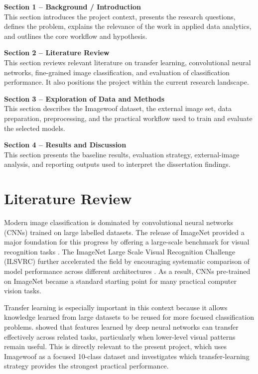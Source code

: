 \documentclass[12pt, a4paper]{article}
\begin{document}
\textbf{Section 1 -- Background / Introduction}\\
This section introduces the project context, presents the research questions, defines the problem, explains the relevance of the work in applied data analytics, and outlines the core workflow and hypothesis.

\textbf{Section 2 -- Literature Review}\\
This section reviews relevant literature on transfer learning, convolutional neural networks, fine-grained image classification, and evaluation of classification performance. It also positions the project within the current research landscape.

\textbf{Section 3 -- Exploration of Data and Methods}\\
This section describes the Imagewoof dataset, the external image set, data preparation, preprocessing, and the practical workflow used to train and evaluate the selected models.

\textbf{Section 4 -- Results and Discussion}\\
This section presents the baseline results, evaluation strategy, external-image analysis, and reporting outputs used to interpret the dissertation findings.

\section{Literature Review}

Modern image classification is dominated by convolutional neural networks (CNNs) trained on large labelled datasets. The release of ImageNet provided a major foundation for this progress by offering a large-scale benchmark for visual recognition tasks \citep{deng2009imagenet}. The ImageNet Large Scale Visual Recognition Challenge (ILSVRC) further accelerated the field by encouraging systematic comparison of model performance across different architectures \citep{russakovsky2015imagenet}. As a result, CNNs pre-trained on ImageNet became a standard starting point for many practical computer vision tasks.

Transfer learning is especially important in this context because it allows knowledge learned from large datasets to be reused for more focused classification problems. \citet{yosinski2014transferable} showed that features learned by deep neural networks can transfer effectively across related tasks, particularly when lower-level visual patterns remain useful. This is directly relevant to the present project, which uses Imagewoof as a focused 10-class dataset and investigates which transfer-learning strategy provides the strongest practical performance.
\end{document}
